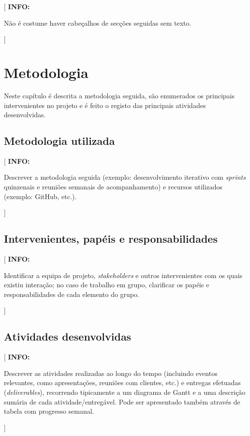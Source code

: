 \documentclass[11pt,a4paper]{report}
\newenvironment{info}[1]{\vspace*{6mm}\color{blue}[ \textbf{INFO:} \begin{em} #1}
                        {\vspace*{3mm}\end{em} ]}
\begin{document}
\begin{info}
Não é costume haver cabeçalhos de secções seguidas sem texto.
\end{info}


\chapter{Metodologia}

Neste capítulo é descrita a metodologia seguida, são enumerados os
principais intervenientes no projeto e é feito o registo das
principais atividades desenvolvidas.

\section{Metodologia utilizada}

\begin{info}
Descrever a metodologia seguida (exemplo: desenvolvimento iterativo
com \emph{sprints} quinzenais e reuniões semanais de acompanhamento) e
recursos utilizados (exemplo: GitHub, etc.).
\end{info}

\section{Intervenientes, papéis e responsabilidades}

\begin{info}
Identificar a equipa de projeto, \emph{stakeholders} e outros
intervenientes com os quais existiu interação; no caso de trabalho em
grupo, clarificar os papéis e responsabilidades de cada elemento do grupo.
\end{info}

\section{Atividades desenvolvidas}

\begin{info}
Descrever as atividades realizadas ao longo do tempo (incluindo
eventos relevantes, como apresentações, reuniões com clientes, etc.)
e entregas efetuadas (\emph{deliverables}), recorrendo tipicamente a
um diagrama de Gantt e a uma descrição sumária de cada
atividade/entregável.
Pode ser apresentado também através de tabela com progresso semanal.
\end{info}
\end{document}
